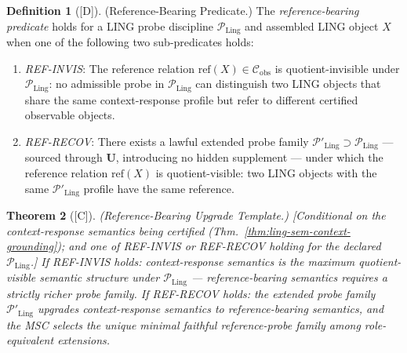 \documentclass[12pt,oneside]{amsbook}
\theoremstyle{plain}
\newtheorem{theorem}{Theorem}[section]
\theoremstyle{definition}
\newtheorem{definition}[theorem]{Definition}
\theoremstyle{remark}
\newcommand{\status}[1]{\textup{[#1]}}
\begin{document}
\begin{definition}[\status{D}]\label{def:ling-ref-predicate}
\textup{(Reference-Bearing Predicate.)}
The \emph{reference-bearing predicate} holds for a LING probe
discipline $\mathcal{P}_{\mathrm{Ling}}$ and assembled LING object
$X$ when one of the following two sub-predicates holds:
\begin{enumerate}[label=\textup{(\Alph*)}]
  \item \emph{REF-INVIS}: The reference relation
    $\mathrm{ref}(X) \in \mathcal{C}_{\mathrm{obs}}$ is
    quotient-invisible under $\mathcal{P}_{\mathrm{Ling}}$:
    no admissible probe in $\mathcal{P}_{\mathrm{Ling}}$ can
    distinguish two LING objects that share the same
    context-response profile but refer to different certified
    observable objects.

  \item \emph{REF-RECOV}: There exists a lawful extended probe
    family $\mathcal{P}'_{\mathrm{Ling}} \supset
    \mathcal{P}_{\mathrm{Ling}}$ --- sourced through $\mathbf{U}$,
    introducing no hidden supplement --- under which the reference
    relation $\mathrm{ref}(X)$ is quotient-visible: two LING
    objects with the same $\mathcal{P}'_{\mathrm{Ling}}$ profile
    have the same reference.
\end{enumerate}
\end{definition}

\begin{theorem}[\status{C}]\label{thm:ling-sem-ref-template}
\textup{(Reference-Bearing Upgrade Template.)}
\textup{[Conditional on the context-response semantics being
certified (Thm.~\ref{thm:ling-sem-context-grounding}); and one of
REF-INVIS or REF-RECOV holding for the declared
$\mathcal{P}_{\mathrm{Ling}}$.]}
If REF-INVIS holds: context-response semantics is the maximum
quotient-visible semantic structure under $\mathcal{P}_{\mathrm{Ling}}$
--- reference-bearing semantics requires a strictly richer probe family.
If REF-RECOV holds: the extended probe family
$\mathcal{P}'_{\mathrm{Ling}}$ upgrades context-response semantics
to reference-bearing semantics, and the MSC selects the unique
minimal faithful reference-probe family among role-equivalent
extensions.
\end{theorem}
\end{document}
